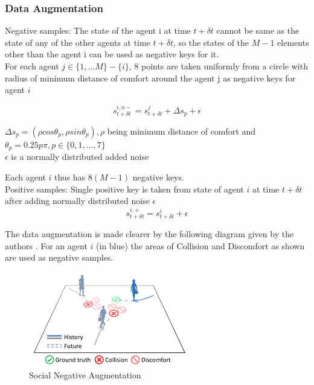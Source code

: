 \subsubsection{Data Augmentation}
Negative samples: The state of the agent i at time $t + {\delta}t$ cannot be same as the state of any of the other agents at time $t + {\delta}t$, so the states of the $M - 1$ elements other than the agent i can be used as negative keys for it. \\
For each agent $j \in \{1,...M\} - \{i\}$, 8 points are taken uniformly from a circle with radius of minimum distance of comfort around the agent j as negative keys for agent $i$


\begin{equation}
s_{t+{\delta}t}^{i,n-} = s_{t+{\delta}t}^{j} + {\Delta}s_p + \epsilon
\end{equation}

${\Delta}s_p = ({\rho}cos{\theta}_p, {\rho}sin{\theta}_p), \rho$ being minimum distance of comfort and ${\theta}_p = 0.25p\pi, p \in \{0, 1,...,7\}$ \\
$\epsilon$ is a normally distributed added noise 


Each agent $i$ thus has $8(M - 1)$ negative keys.\\
Positive samples: Single positive key is taken from state of agent $i$ at time $t + {\delta}t$ after adding normally distributed noise $\epsilon$
\begin{equation}
s_{t+{\delta}t}^{i,+} = s_{t+{\delta}t}^{i} + \epsilon
\end{equation}

The data augmentation is made clearer by the following diagram given by the authors \cite {liu2020snce}. For an agent $i$ (in blue) the areas of Collision and Discomfort as shown are used as negative samples.
\begin{figure}[htp]
    \centering
    \includegraphics[width=7cm]{illustration.png}
    \caption{Social Negative Augmentation}
    \label{fig:Social Negative Augmentation}
\end{figure}

